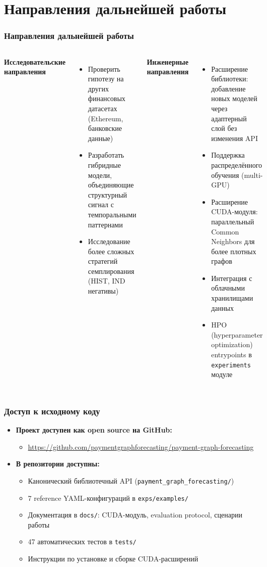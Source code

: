 \documentclass[aspectratio=169]{beamer}
\begin{document}
\section{Направления дальнейшей работы}
\begin{frame}
  \frametitle{Направления дальнейшей работы}
  \begin{columns}
    \textbf{Исследовательские направления}
    \begin{itemize}
      \item Проверить гипотезу на других финансовых датасетах (Ethereum, банковские данные)
      \item Разработать гибридные модели, объединяющие структурный сигнал с темпоральными паттернами
      \item Исследование более сложных стратегий семплирования (HIST, IND негативы)
    \end{itemize}
    \textbf{Инженерные направления}
    \begin{itemize}
      \item Расширение библиотеки: добавление новых моделей через адаптерный слой без изменения API
      \item Поддержка распределённого обучения (multi-GPU)
      \item Расширение CUDA-модуля: параллельный Common Neighbors для более плотных графов
      \item Интеграция с облачными хранилищами данных
      \item HPO (hyperparameter optimization) entrypoints в \texttt{experiments} модуле
    \end{itemize}
  \end{columns}
\end{frame}

\begin{frame}
  \frametitle{Доступ к исходному коду}
  \begin{itemize}
    \item \textbf{Проект доступен как open source на GitHub:}
      \begin{itemize}
        \item \url{https://github.com/paymentgraphforecasting/payment-graph-forecasting}
      \end{itemize}
    \item \textbf{В репозитории доступны:}
      \begin{itemize}
        \item Канонический библиотечный API (\texttt{payment\_graph\_forecasting/})
        \item 7 reference YAML-конфигураций в \texttt{exps/examples/}
        \item Документация в \texttt{docs/}: CUDA-модуль, evaluation protocol, сценарии работы
        \item 47 автоматических тестов в \texttt{tests/}
        \item Инструкции по установке и сборке CUDA-расширений
      \end{itemize}
  \end{itemize}
\end{frame}
\end{document}

